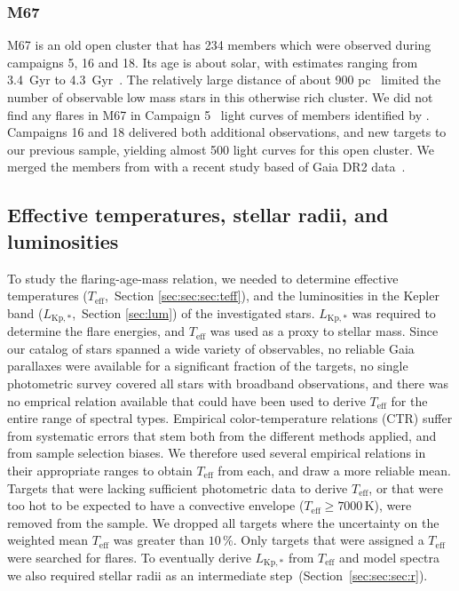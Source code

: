 \documentclass{aa}
\begin{document}
\subsubsection{M67}
M67 is an old open cluster that has 234 members which were observed during campaigns 5, 16 and 18. Its age is about solar, with estimates ranging from 3.4~Gyr to 4.3~Gyr~\citep{salaris_age_2004, onehag2011, dias_fitting_2012, scholz2015, barnes_rotation_2016, bossini2019}. The relatively large distance of about 900 pc~\citep{dias_fitting_2012} limited the number of observable low mass stars in this otherwise rich cluster. We did not find any flares in M67 in Campaign 5~ light curves of members identified by \citet{gonzalez_m67mem_2016}. Campaigns 16 and 18 delivered both additional observations, and new targets to our previous sample, yielding almost 500 light curves for this open cluster. We merged the members from \citet{gonzalez_m67mem_2016} with a recent study based of Gaia DR2 data~\citep{gao_m67mem_2018}.
\subsection{Effective temperatures, stellar radii, and luminosities}
\label{TeffRL}
To study the flaring-age-mass relation, we needed to determine effective temperatures ($T_\mathrm{eff}$,~Section \ref{sec:sec:sec:teff}), and the luminosities in the Kepler band ($L_\mathrm{Kp,*}$,~Section \ref{sec:lum}) of the investigated stars. $L_\mathrm{Kp,*}$ was required to determine the flare energies, and $T_\mathrm{eff}$ was used as a proxy to stellar mass. Since our catalog of stars spanned a wide variety of observables, no reliable Gaia parallaxes were available for a significant fraction of the targets, no single photometric survey covered all stars with broadband observations, and there was no emprical relation available that could have been used to derive $T_\mathrm{eff}$ for the entire range of spectral types. Empirical color-temperature relations (CTR) suffer from systematic errors that stem both from the different methods applied, and from sample selection biases. We therefore used several empirical relations in their appropriate ranges to obtain $T_\mathrm{eff}$ from each, and draw a more reliable mean. Targets that were lacking sufficient photometric data to derive $T_\mathrm{eff}$, or that were too hot to be expected to have a convective envelope ($T_\mathrm{eff} \geq 7000\,$K), were removed from the sample. We dropped all targets where the uncertainty on the weighted mean $T_\mathrm{eff}$ was greater than $10\,$\%. Only targets that were assigned a $T_\mathrm{eff}$ were searched for flares. To eventually derive $L_\mathrm{Kp,*}$ from $T_\mathrm{eff}$ and model spectra we also required stellar radii as an intermediate step~(Section~\ref{sec:sec:sec:r}).
\end{document}
